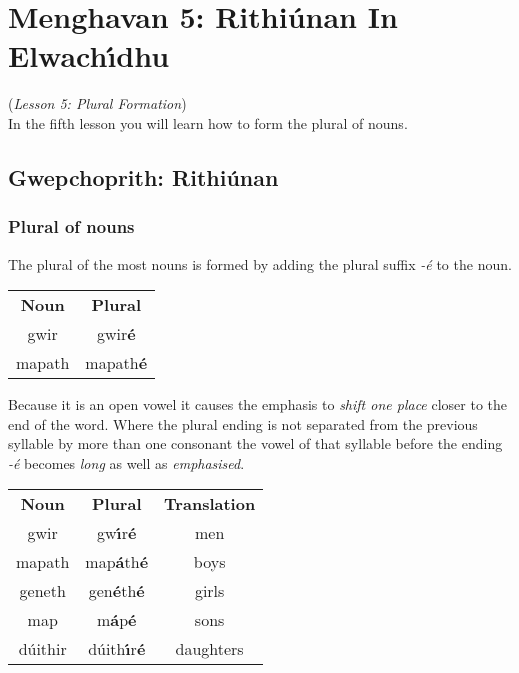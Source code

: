 \section{Menghavan 5: Rithi\'{u}nan In Elwach\'{\i}dhu}
(\textit{Lesson 5: Plural Formation})\\

In the fifth lesson you will learn how to form the plural of nouns.\\

\subsection{Gwepchoprith: Rithi\'{u}nan}
\subsubsection{Plural of nouns}

The plural of the most nouns is formed by adding the plural suffix \textit{-\'{e}} to the noun.
\begin{table}[H]
\centering
\begin{tabular}{cc}
  \toprule
  \textbf{Noun} & \textbf{Plural}\\
  \cmidrule(lr){1-1}\cmidrule(lr){2-2}
  gwir & gwir\textbf{\'{e}}\\
  mapath & mapath\textbf{\'{e}}\\
  \bottomrule
\end{tabular}
\label{example_noun_plural}
\end{table}

Because it is an open vowel it causes the emphasis to \textit{shift one place} closer to the end of the word. Where the plural ending is not separated from the previous syllable by more than one consonant the vowel of that syllable before the ending \textit{-\'{e}} becomes \textit{long} as well as \textit{emphasised}.
\begin{table}[H]
\centering
\begin{tabular}{ccc}
  \toprule
  \textbf{Noun} & \textbf{Plural} & \textbf{Translation}\\
  \cmidrule(lr){1-1}\cmidrule(lr){2-2}\cmidrule(lr){3-3}
  gwir & gw\textbf{\'{\i}}r\textbf{\'{e}} & men\\
  mapath & map\textbf{\'{a}}th\textbf{\'{e}} & boys\\
  geneth & gen\textbf{\'{e}}th\textbf{\'{e}} & girls\\
  map & m\textbf{\'{a}}p\textbf{\'{e}} & sons\\
  d\'{u}ithir & d\'{u}ith\textbf{\'{\i}}r\textbf{\'{e}} & daughters\\
  \bottomrule
\end{tabular}
\label{example_emphasis_shift}
\end{table}

